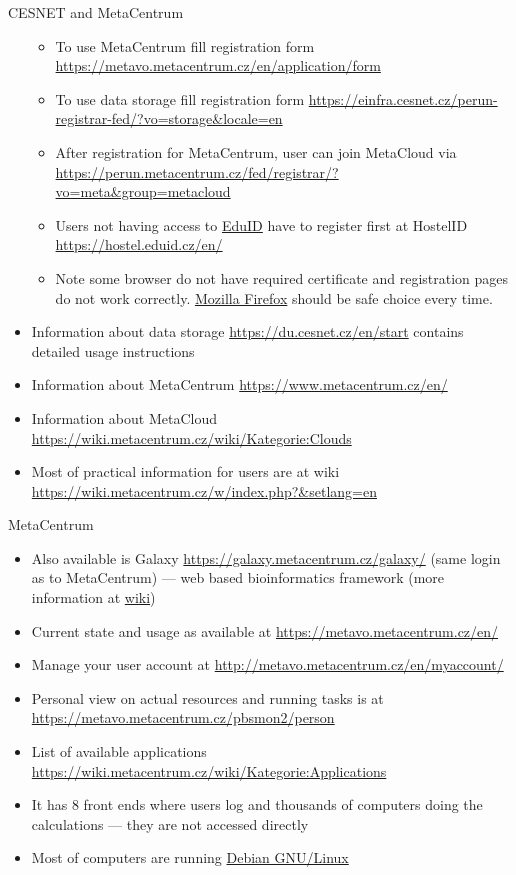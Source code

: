 \documentclass[compress, ucs, xelatex, 11pt, xcolor=svgnames,
  hyperref={
    bookmarks=true,
    unicode=true,
    colorlinks=true,
    pdftitle={Linux, command line and MetaCentrum},
    plainpages=false,
    pdfauthor={Vojtech Zeisek},
    pdfsubject={Course about use of Linux command line, writing shell scripts and using MetaCentrum of CESNET},
    pdfcreator={XeLaTeX},
    pdfkeywords={Linux, GNU, BASH, shell, command line, MetaCentrum},
    linkcolor=DarkRed,
    anchorcolor=DarkBlue,
    citecolor=Indigo,
    filecolor=NavyBlue,
    menucolor=DarkMagenta,
    urlcolor=DarkBlue,
    pdftex},
  url={hyphens, lowtilde} %
  ]{beamer}
\begin{document}
\begin{frame}[allowframebreaks]{CESNET and MetaCentrum}
\begin{itemize}
\begin{itemize}
      \item To use MetaCentrum fill registration form \url{https://metavo.metacentrum.cz/en/application/form}
      \item To use data storage fill registration form \url{https://einfra.cesnet.cz/perun-registrar-fed/?vo=storage&locale=en}
      \item After registration for MetaCentrum, user can join MetaCloud via \url{https://perun.metacentrum.cz/fed/registrar/?vo=meta&group=metacloud}
      \item Users not having access to \href{https://www.eduid.cz/en/index}{EduID} have to register first at HostelID \url{https://hostel.eduid.cz/en/}
      \item Note some browser do not have required certificate and registration pages do not work correctly. \href{https://www.mozilla.org/firefox/}{Mozilla Firefox} should be safe choice every time.
    \end{itemize}
    \item Information about data storage \url{https://du.cesnet.cz/en/start} contains detailed usage instructions
    \item Information about MetaCentrum \url{https://www.metacentrum.cz/en/}
    \item Information about MetaCloud \url{https://wiki.metacentrum.cz/wiki/Kategorie:Clouds}
    \item Most of practical information for users are at wiki \url{https://wiki.metacentrum.cz/w/index.php?&setlang=en}
  \end{itemize}
\end{frame}

\begin{frame}{MetaCentrum}
  \begin{itemize}
    \item Also available is Galaxy \url{https://galaxy.metacentrum.cz/galaxy/} (same login as to MetaCentrum) --- web based bioinformatics framework (more information at \href{https://wiki.metacentrum.cz/wiki/Galaxy}{wiki})
    \item Current state and usage as available at \url{https://metavo.metacentrum.cz/en/}
    \item Manage your user account at \url{http://metavo.metacentrum.cz/en/myaccount/}
    \item Personal view on actual resources and running tasks is at \url{https://metavo.metacentrum.cz/pbsmon2/person}
    \item List of available applications \url{https://wiki.metacentrum.cz/wiki/Kategorie:Applications}
    \item It has 8 front ends where users log and thousands of computers doing the calculations --- they are not accessed directly
    \item Most of computers are running \href{https://www.debian.org/}{Debian GNU/Linux}
  \end{itemize}
\end{frame}
\end{document}
